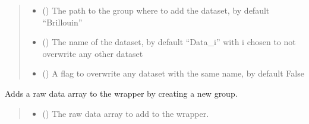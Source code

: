 \documentclass[letterpaper,10pt,english]{sphinxmanual}
\begin{document}
\begin{fulllineitems}
\begin{fulllineitems}
\begin{quote}
\begin{description}
\begin{itemize}
\item {} 
\sphinxAtStartPar
{} (\sphinxstyleliteralemphasis{\sphinxupquote{, }}) \textendash{} The path to the group where to add the dataset, by default “Brillouin”

\item {} 
\sphinxAtStartPar
{} (\sphinxstyleliteralemphasis{\sphinxupquote{, }}) \textendash{} The name of the dataset, by default “Data\_i” with i chosen to not overwrite any other dataset

\item {} 
\sphinxAtStartPar
{} (\sphinxstyleliteralemphasis{\sphinxupquote{, }}) \textendash{} A flag to overwrite any dataset with the same name, by default False

\end{itemize}

\end{description}\end{quote}

\end{fulllineitems}


\begin{fulllineitems}
\label{\detokenize{source/_autosummary/HDF5_BLS.Wrapper:HDF5_BLS.Wrapper.add_raw_data}}
\pysigstartsignatures
\pysiglinewithargsret
{}
{\sphinxparamcomma {}\sphinxparamcomma {}\sphinxparamcomma {}}
{}
\pysigstopsignatures
\sphinxAtStartPar
Adds a raw data array to the wrapper by creating a new group.
\begin{quote}\begin{description}
\begin{itemize}
\item {} 
\sphinxAtStartPar
{} () \textendash{} The raw data array to add to the wrapper.


\end{itemize}
\end{description}
\end{quote}
\end{fulllineitems}
\end{fulllineitems}
\end{document}
